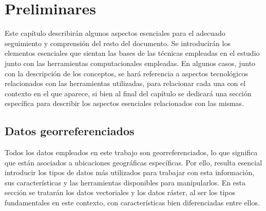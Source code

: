 \documentclass[12pt,a4paper,]{book}
\title{}
\author{Nombre Completo Autor}
\date{18/11/2021}
\def\ifdoblecara{} %
\def\ifprincipal{} %
\let\ifprincipal\undefined %
\numberwithin{dummy}{section}
\theoremstyle{ocrenumbox}
\theoremstyle{blacknumex}
\theoremstyle{blacknumbox}
\theoremstyle{ocrenum}
\theoremstyle{ocrenum}
\begin{document}




\raggedbottom

\ifdefined\ifprincipal
\else
\setlength{\parindent}{1em}
\pagestyle{fancy}
\setcounter{tocdepth}{4}
\tableofcontents

\fi

\ifdefined\ifdoblecara
\fancyhead{}{}
\fancyhead[LE,RO]{\scriptsize\rightmark}
\fancyfoot[LO,RE]{\scriptsize\slshape \leftmark}
\fancyfoot[C]{}
\fancyfoot[LE,RO]{\footnotesize\thepage}
\else
\fancyhead{}{}
\fancyhead[RO]{\scriptsize\rightmark}
\fancyfoot[LO]{\scriptsize\slshape \leftmark}
\fancyfoot[C]{}
\fancyfoot[RO]{\footnotesize\thepage}
\fi

\renewcommand{\headrulewidth}{0.4pt}
\renewcommand{\footrulewidth}{0.4pt}

\hypertarget{preliminares}{%
\chapter{Preliminares}\label{preliminares}}

Este capítulo describirán algunos aspectos esenciales para el adecuado
seguimiento y comprensión del resto del documento. Se introducirán los
elementos esenciales que sientan las bases de las técnicas empleadas en
el estudio junto con las herramientas computacionales empleadas. En
algunos casos, junto con la descripción de los conceptos, se hará
referencia a aspectos tecnológicos relacionados con las herramientas
utilizadas, para relacionar cada una con el contexto en el que aparece,
si bien al final del capítulo se dedicará una sección específica para
describir los aspectos esenciales relacionados con las mismas.

\hypertarget{datos-georreferenciados}{%
\section{Datos georreferenciados}\label{datos-georreferenciados}}

Todos los datos empleados en este trabajo son georreferenciados, lo que
significa que están asociados a ubicaciones geográficas específicas. Por
ello, resulta esencial introducir los tipos de datos más utilizados para
trabajar con esta información, sus características y las herramientas
disponibles para manipularlos. En esta sección se tratarán los datos
vectoriales y los datos ráster, al ser los tipos fundamentales en este
contexto, con características bien diferenciadas entre ellos.
\end{document}
